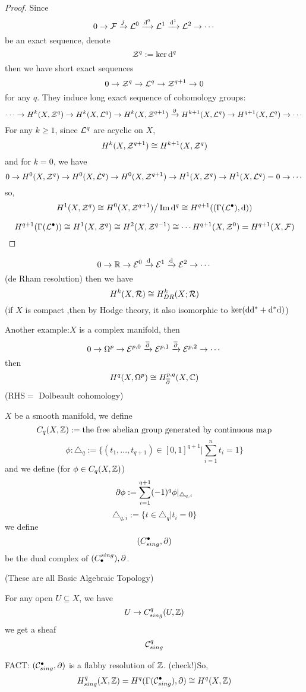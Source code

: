\begin{proof}
Since
$$
0\to \mathcal{F}\xrightarrow{j}\mathcal{L}^0\xrightarrow{\mathrm{d}^0}\mathcal{L}^1\xrightarrow{\mathrm{d}^1}\mathcal{L}^2\to\cdots
$$
be an exact sequence, denote
$$\mathcal{Z}^q:=\ker \mathrm{d}^q$$
then we have short exact sequences
$$0\to \mathcal{Z}^q\to\mathcal{L}^q\to\mathcal{Z}^{q+1}\to 0$$
for any $q$. They induce long exact sequence of cohomology groups:
$$\cdots\to H^k(X,\mathcal{Z}^q)\to H^k(X,\mathcal{L}^q)\to H^k(X,\mathcal{Z}^{q+1})\xrightarrow{\partial}
H^{k+1}(X,\mathcal{L}^q)\to H^{q+1}(X,\mathcal{L}^q)\to\cdots$$
For any $k\geq 1$, since $\mathcal{L}^q$ are acyclic on $X$,
$$H^k(X,\mathcal{Z}^{q+1})\cong H^{k+1}(X,\mathcal{Z}^q)$$
and for $k=0$, we have
$$
0\to H^0(X,\mathcal{Z}^q)\to H^0(X,\mathcal{L}^q)\to H^0(X,\mathcal{Z}^{q+1})\to
H^1(X,\mathcal{Z}^q)\to H^1(X,\mathcal{L}^q)=0\to\cdots
$$
so,
$$H^1(X,\mathcal{Z}^q)\cong H^0(X,\mathcal{Z}^{q+1})\big/\operatorname{Im}\mathrm{d}^q
\cong H^{q+1}((\Gamma(\mathcal{L}^{\bullet}),\mathrm{d}))$$

$$H^{q+1}(\Gamma(\mathcal{L}^{\bullet}))\cong H^1(X,\mathcal{Z}^q)\cong H^2(X,\mathcal{Z}^{q-1})\cong\cdots
H^{q+1}(X,\mathcal{Z}^0)=H^{q+1}(X,\mathcal{F})$$
\end{proof}


$$0\to\mathbb{R}\to\mathcal{E}^0\xrightarrow{\mathrm{d}}\mathcal{E}^1\xrightarrow{\mathrm{d}}\mathcal{E}^2\to\cdots$$
(de Rham resolution) then we have
$$H^k(X,\mathcal{R})\cong H_{DR}^k(X;\mathcal{R})$$
(if $X$ is compact ,then by Hodge theory, it also isomorphic to $\ker(\mathrm{d}\mathrm{d}^*+\mathrm{d}^*\mathrm{d})$)

Another example:$X$ is a complex manifold, then
$$0\to\Omega^p\to\mathcal{E}^{p,0}\xrightarrow{\overline{\partial}}\mathcal{E}^{p,1}\xrightarrow{\overline{\partial}}\mathcal{E}^{p,2}\to\cdots$$
then
$$H^{q}(X,\Omega^p)\cong H_{\overline{\partial}}^{p,q}(X,\mathbb{C})$$
(RHS$=$ Dolbeault cohomology)


$X$ be a smooth manifold, we define
$$C_q(X,\mathbb{Z}):=\text{the free abelian group generated by continuous map}$$
$$\phi:\triangle_q:=\{(t_1,...,t_{q+1})\in[0,1]^{q+1}|\sum_{i=1}^nt_i=1\}$$
and we define (for $\phi\in C_q(X,\mathbb{Z})$)
$$\partial\phi:=\sum_{i=1}^{q+1}(-1)^q\phi|_{\triangle_{q,i}}$$
$$\triangle_{q,i}:=\{t\in\triangle_q|t_i=0\}$$
we define
$$(C_{sing}^{\bullet},\partial)$$
be the dual complex of $(C^{sing}_{\bullet}),\partial$.

(These are all Basic Algebraic Topology)

For any open $U\subseteq X$, we have
$$U\to C_{sing}^q(U,\mathbb{Z})$$
we get a sheaf
$$\mathcal{C}_{sing}^q$$

FACT: $(\mathcal{C}_{sing}^{\bullet},\partial)$ is a flabby resolution of $\mathbb{Z}$. (check!)So,
$$H^q_{sing}(X,\mathbb{Z})= H^q(\Gamma(\mathcal{C}_{sing}^{\bullet}),\partial)
\cong H^q(X,\mathbb{Z})$$


